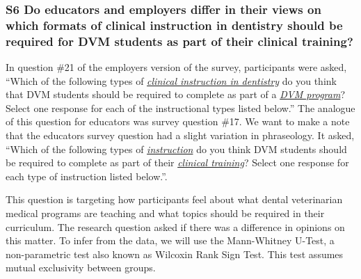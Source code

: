 \documentclass[
  11pt,
  letterpaper,
  DIV=11,
  numbers=noendperiod]{scrartcl}
\numberwithin{figure}{section}
\begin{document}
\subsubsection{S6 Do educators and employers differ in their views on
which formats of clinical instruction in dentistry should be required
for DVM students as part of their clinical
training?}\label{s6-do-educators-and-employers-differ-in-their-views-on-which-formats-of-clinical-instruction-in-dentistry-should-be-required-for-dvm-students-as-part-of-their-clinical-training}

In question \#21 of the employers version of the survey, participants
were asked, ``Which of the following types of \ul{\emph{clinical
instruction in dentistry}} do you think that DVM students should be
required to complete as part of a \ul{\emph{DVM program}}? Select one
response for each of the instructional types listed below.'' The
analogue of this question for educators was survey question \#17. We
want to make a note that the educators survey question had a slight
variation in phraseology. It asked, ``Which of the following types of
\ul{\emph{instruction}} do you think DVM students should be required to
complete as part of their \ul{\emph{clinical training}}? Select one
response for each type of instruction listed below.''.

This question is targeting how participants feel about what dental
veterinarian medical programs are teaching and what topics should be
required in their curriculum. The research question asked if there was a
difference in opinions on this matter. To infer from the data, we will
use the Mann-Whitney U-Test, a non-parametric test also known as
Wilcoxin Rank Sign Test. This test assumes mutual exclusivity between
groups.
\end{document}
